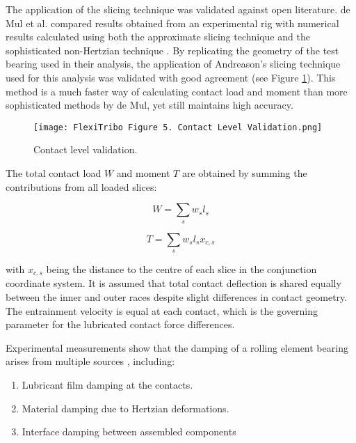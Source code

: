 The application of the slicing technique was validated against open literature. de Mul et al. \cite{DeMul1989_2} compared results obtained from an experimental rig with numerical results calculated using both the approximate slicing technique and the sophisticated non-Hertzian technique \cite{DeMul1986}. By replicating the geometry of the test bearing used in their analysis, the application of Andreason’s slicing technique used for this analysis was validated with good agreement (see Figure \ref{Contact level validation}). This method is a much faster way of calculating contact load and moment than more sophisticated methods by de Mul, yet still maintains high accuracy.

\begin{figure}  
	\texttt{[image: FlexiTribo Figure 5. Contact Level Validation.png]}
	\caption{Contact level validation.}
	\label{Contact level validation}
\end{figure} 

The total contact load $W$ and moment $T$ are obtained by summing the contributions from all loaded slices:

\begin{equation}\label{Total contact load flexitribo}
	W=\sum_s w_s l_s
\end{equation}

\begin{equation}\label{Total contact torque flexitribo}
	T=\sum_s w_s l_s x_{c, s}
\end{equation}

with $x_{c, s}$ being the distance to the centre of each slice in the conjunction coordinate system. It is assumed that total contact deflection is shared equally between the inner and outer races despite slight differences in contact geometry. The entrainment velocity is equal at each contact, which is the governing parameter for the lubricated contact force differences.

Experimental measurements show that the damping of a rolling element bearing arises from multiple sources \cite{Dietl1997}, including:
 
\begin{enumerate}
	\item Lubricant film damping at the contacts.
	\item Material damping due to Hertzian deformations.
	\item Interface damping between assembled components
\end{enumerate}

